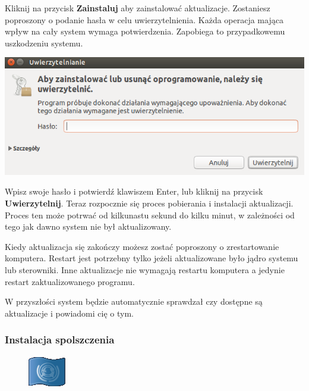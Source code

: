 Kliknij na przycisk \textbf{Zainstaluj} aby zainstalować aktualizacje. Zostaniesz poproszony o podanie hasła w celu uwierzytelnienia. Każda operacja mająca wpływ na cały system wymaga potwierdzenia. Zapobiega to przypadkowemu uszkodzeniu systemu.
\begin{center}
	\includegraphics{images/unity_uwierzytelnienie.png}
\end{center}

Wpisz swoje hasło i potwierdź klawiszem Enter, lub kliknij na przycisk \textbf{Uwierzytelnij}. Teraz rozpocznie się proces pobierania i instalacji aktualizacji. Proces ten może potrwać od kilkunastu sekund do kilku minut, w zależności od tego jak dawno system nie był aktualizowany.

Kiedy aktualizacja się zakończy możesz zostać poproszony o zrestartowanie komputera. Restart jest potrzebny tylko jeżeli aktualizowane było jądro systemu lub sterowniki. Inne aktualizacje nie wymagają restartu komputera a jedynie restart zaktualizowanego programu.

W przyszłości system będzie automatycznie sprawdzał czy dostępne są aktualizacje i powiadomi cię o tym.
\clearpage

\subsubsection{Instalacja spolszczenia}
\begin{figure}
	\includegraphics[width=\linewidth]{images/pierwsze_uruchomienie_lang1.png}
\end{figure}

